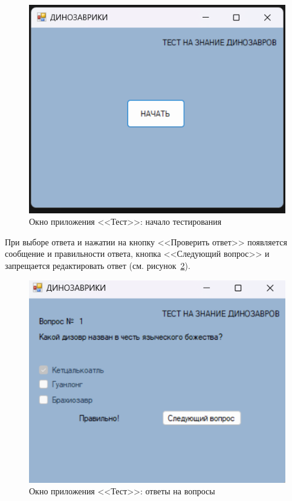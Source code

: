 \documentclass[bachelor, och, pract, times]{SCWorks}
\begin{document}
\begin{figure}[H]
    \centering
    \includegraphics[scale=0.7]{Скрины/Снимок экрана 2025-01-05 213834.png}
    \caption{Окно приложения <<Тест>>: начало тестирования}\label{fig:test-03}
\end{figure}

При выборе ответа и нажатии на кнопку <<Проверить ответ>> появляется сообщение и правильности ответа, кнопка <<Следующий вопрос>> и запрещается редактировать ответ (см. рисунок~\ref{fig:test-04}).

\begin{figure}[H]
    \centering
    \includegraphics[scale=0.7]{Скрины/Снимок экрана 2025-01-05 213922.png}
    \caption{Окно приложения <<Тест>>: ответы на вопросы}\label{fig:test-04}
\end{figure}
\end{document}
